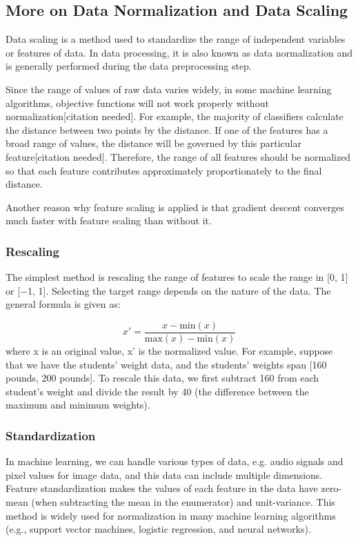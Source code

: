 \documentclass[a4paper,12pt]{article}
\begin{document}
\newpage
\subsection{More on Data Normalization and Data Scaling}
Data scaling is a method used to standardize the range of independent variables or features of data. In data processing, it is also known as data normalization and is generally performed during the data preprocessing step.

Since the range of values of raw data varies widely, in some machine learning algorithms, objective functions will not work properly without normalization[citation needed]. For example, the majority of classifiers calculate the distance between two points by the distance. If one of the features has a broad range of values, the distance will be governed by this particular feature[citation needed]. Therefore, the range of all features should be normalized so that each feature contributes approximately proportionately to the final distance.

Another reason why feature scaling is applied is that gradient descent converges much faster with feature scaling than without it.

\subsubsection{Rescaling}
The simplest method is rescaling the range of features to scale the range in [0, 1] or [−1, 1]. Selecting the target range depends on the nature of the data. The general formula is given as:

\[ x' = \frac{x - \text{min}(x)}{\text{max}(x)-\text{min}(x)}\]
where x is an original value, x' is the normalized value. For example, suppose that we have the students' weight data, and the students' weights span [160 pounds, 200 pounds]. To rescale this data, we first subtract 160 from each student's weight and divide the result by 40 (the difference between the maximum and minimum weights).

\subsubsection{Standardization}
In machine learning, we can handle various types of data, e.g. audio signals and pixel values for image data, and this data can include multiple dimensions. Feature standardization makes the values of each feature in the data have zero-mean (when subtracting the mean in the enumerator) and unit-variance. This method is widely used for normalization in many machine learning algorithms (e.g., support vector machines, logistic regression, and neural networks). 
\end{document}
